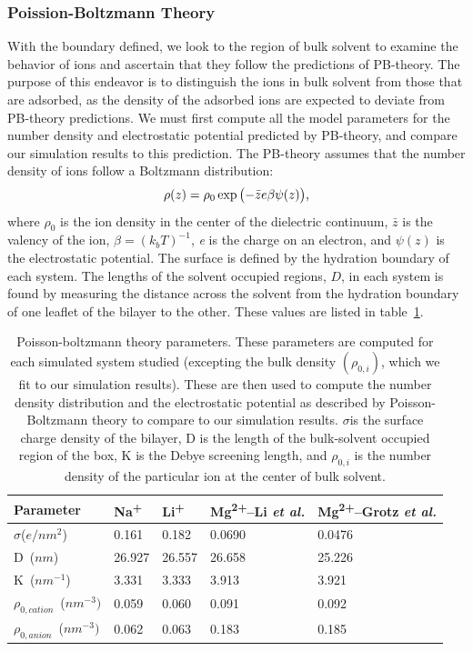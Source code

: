 \documentclass[12pt,openany,final]{book}
\newcommand{\etal}{\textit{et al.}}
\newcommand{\sig}{$\sigma$}
\newcommand{\na}{Na\textsuperscript{+}}
\newcommand{\li}{Li\textsuperscript{+}}
\newcommand{\mgmbnbfix}{Mg\textsuperscript{2+}--Li \etal} %
\newcommand{\mgmicro}{Mg\textsuperscript{2+}--Grotz \etal}
\begin{document}
\subsubsection{Poission-Boltzmann Theory}
With the boundary defined, we look to the region of bulk solvent to examine the behavior of ions and ascertain that
they follow the predictions of PB-theory\cite{israelachvili:2011:intermol}. 
The purpose of this endeavor is to distinguish the ions in bulk solvent from those that are adsorbed,
as the density of the adsorbed ions are expected to deviate from PB-theory predictions.
We must first compute all the model parameters for the number density and electrostatic potential predicted by
PB-theory, and compare our simulation results to this prediction.
The PB-theory assumes 
that the number density of ions follow a Boltzmann distribution:
\begin{equation}
    \rho(z) = \rho_0 \exp\big({- \bar z \text{\si{\elementarycharge}} \beta \psi(z)}\big)\text{,}
    \label{eq:gcnum}
\end{equation}
where $\rho_0$ is the ion density in the center of the dielectric continuum, $\bar z$ is the valency of the ion, 
$\beta = (k_bT)^{-1}$, \si{\elementarycharge} is the charge
on an electron, and $\psi(z)$ is the electrostatic potential. The surface is defined by the hydration boundary of each system. 
The lengths of the solvent occupied regions, $D$, {in each system is} found by measuring the distance across the solvent from the 
hydration boundary of one leaflet of the bilayer to the other. 
These values are listed in table~\ref{tab:gctheory:ch2}.
\begin{table}
    \caption[Poisson-boltzmann theory parameters]{Poisson-boltzmann theory parameters. These parameters are computed for each
    simulated system studied (excepting the bulk density $(\rho_{0,i})$, 
    which we fit to our simulation results). These are then used to compute the
    number density distribution and the electrostatic potential as described by 
    Poisson-Boltzmann theory to compare to our simulation results.
    \sig is the surface charge density of the bilayer, D is the length
    of the bulk-solvent occupied region of the box, K is the Debye
    screening length, and $\rho_{0,i}$ is the number density of the particular 
    ion at the center of bulk solvent.}
    \label{tab:gctheory:ch2}
    \begin{tabularx}{\textwidth}{|X|X|X|X|X|}\hline
        Parameter                    & \na  & \li    & \mgmbnbfix    & \mgmicro \\\hline
        \sig ($e/nm^{2}$)            &0.161 &0.182   &0.0690  &0.0476     \\\hline
        D~($nm$)                     &26.927&26.557  &26.658  &25.226     \\\hline
        K~($nm^{-1}$)                &3.331 &3.333   &3.913   &3.921      \\\hline
        $\rho_{0,cation}$~($nm^{-3})$&0.059 &0.060   &0.091   &0.092      \\\hline
        $\rho_{0,anion}$~($nm^{-3})$ &0.062 &0.063   &0.183   &0.185      \\\hline
    \end{tabularx}
\end{table}
\end{document}
